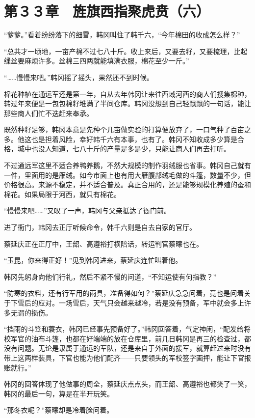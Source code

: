 \section{第３３章　旌旗西指聚虎贲（六）}

“爹爹。”看着纷纷落下的细雪，韩冈叫住了韩千六，“今年棉田的收成怎么样？”

“总共才一顷地，一亩产棉不过七八十斤。收上来后，又要去籽，又要梳理，比起缫丝要麻烦许多。丝棉三四两就能填满衣服，棉花至少一斤。”

“……慢慢来吧。”韩冈摇了摇头，果然还不到时候。

棉花种植在通远军还是第一年，自从去年韩冈让来往西域河西的商人们搜集棉种，转过年来便是一包包棉籽堆满了半间仓库。韩冈没想到自己轻飘飘的一句话，能让那些商人们忙不迭赶来奉承。

既然种籽足够，韩冈本意是先种个几亩做实验的打算便放弃了，一口气种了百亩之多。他这也是担着风险，幸好韩千六有本事，也有了。韩冈不知收成多少算是合格，城中也没人知道，七八十斤的产量是多是少，只能让商人们再去打听。

不过通远军这里不适合养鸭养鹅，不然大规模的制作羽绒服也省事。韩冈自己就有一件，里面用的是雁绒。如今市面上也有用大雁腹部绒毛做的斗篷，数量不少，但价格很高。来源不稳定，并不适合普及。真正合用的，还是能够规模化养殖的蚕和棉花。如果局限于河西，就只有棉花。

“慢慢来吧……”又叹了一声，韩冈与父亲抵达了衙门前。

进了衙门，韩冈去正厅听候命令，韩千六则是自去自家的官厅。

蔡延庆正在正厅中，王韶、高遵裕打横陪话，转运判官蔡曚也在。

“玉昆，你来得正好！”见到韩冈进来，蔡延庆连忙叫着他。

韩冈先躬身向他们行礼，然后不紧不慢的问道，“不知运使有何指教？”

“防寒的衣料，还有行军用的雨具，准备得如何？”蔡延庆急急问着，竟也是问着关于下雪后的应对。一场雪后，天气只会越来越冷，若是没有预备，军中就会多上许多无谓的损伤。

“挡雨的斗笠和蓑衣，韩冈已经事先预备好了。”韩冈回答着，气定神闲，“配发给将校军官的油布斗篷，也都在好端端的放在仓库里，前几日韩冈是再三的检查过，都没有问题。无论是隶属于通远的军队，还是来自于外面的援军，就算赶过来时没有带上这两样装具，下官也能为他们配齐——只要领头的军校签字画押，能让下官报账就行。”

韩冈的回答体现了他做事的周全，蔡延庆点点头，而王韶、高遵裕也都笑了一笑，韩冈的最后一句，算是在半开玩笑。

“那冬衣呢？”蔡曚却是冷着脸问着。

